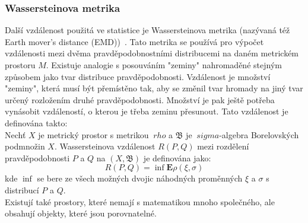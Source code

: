 \subsubsection{Wassersteinova metrika}
Další vzdálenost použitá ve statistice je Wassersteinova metrika (nazývaná též Earth mover's distance (EMD))~\cite{Vallender73}. Tato metrika se používá pro výpočet vzdálenosti mezi dvěma pravděpodobnostními distribucemi na daném metrickém prostoru $M$. Existuje analogie s posouváním "zeminy" nahromaděné stejným způsobem jako tvar distribuce pravděpodobnosti. Vzdálenost je množství "zeminy", která musí být přemístěno tak, aby se změnil tvar hromady na jiný tvar určený rozložením druhé pravděpodobnosti. Množství je pak ještě potřeba vynásobit vzdáleností, o kterou je třeba zeminu přesunout. Tato vzdálenost je definována takto: \\
Nechť $X$ je metrický prostor s metrikou $\ rho$ a $\mathfrak {B}$ je $\ sigma$-algebra Borelovských podmnožin $X$. Wassersteinova vzdálenost $R(P, Q)$ mezi rozdělení pravděpodobnosti $P$ a $Q$ na $(X, \mathfrak{B}) $ je definována jako:
$$R(P,Q)=\inf\mathbf{E}\rho(\xi, \sigma)$$
kde $\inf$ se bere  ze všech možných dvojic náhodných proměnných $\xi$ a $\sigma$ s distribucí $P$ a $Q$.\\

Existují také prostory, které nemají s matematikou mnoho společného, ale obsahují objekty, které jsou porovnatelné.

